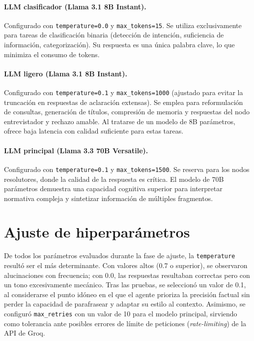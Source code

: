 \documentclass[12pt,a4paper,oneside]{report}
\begin{document}
\paragraph{LLM clasificador (Llama 3.1 8B Instant).} Configurado con \texttt{temperature=0.0} y \texttt{max\_tokens=15}. Se utiliza exclusivamente para tareas de clasificación binaria (detección de intención, suficiencia de información, categorización). Su respuesta es una única palabra clave, lo que minimiza el consumo de tokens.

\paragraph{LLM ligero (Llama 3.1 8B Instant).} Configurado con \texttt{temperature=0.1} y \texttt{max\_tokens=1000} (ajustado para evitar la truncación en respuestas de aclaración extensas). Se emplea para reformulación de consultas, generación de títulos, compresión de memoria y respuestas del nodo entrevistador y rechazo amable. Al tratarse de un modelo de 8B parámetros, ofrece baja latencia con calidad suficiente para estas tareas.

\paragraph{LLM principal (Llama 3.3 70B Versatile).} Configurado con \texttt{temperature=0.1} y \texttt{max\_tokens=1500}. Se reserva para los nodos resolutores, donde la calidad de la respuesta es crítica. El modelo de 70B parámetros demuestra una capacidad cognitiva superior para interpretar normativa compleja y sintetizar información de múltiples fragmentos.


\section{Ajuste de hiperparámetros}

De todos los parámetros evaluados durante la fase de ajuste, la \texttt{temperature} resultó ser el más determinante. Con valores altos (0.7 o superior), se observaron alucinaciones con frecuencia; con 0.0, las respuestas resultaban correctas pero con un tono excesivamente mecánico. Tras las pruebas, se seleccionó un valor de 0.1, al considerarse el punto idóneo en el que el agente prioriza la precisión factual sin perder la capacidad de parafrasear y adaptar su estilo al contexto. Asimismo, se configuró \texttt{max\_retries} con un valor de 10 para el modelo principal, sirviendo como tolerancia ante posibles errores de límite de peticiones (\textit{rate-limiting}) de la API de Groq.
\end{document}
